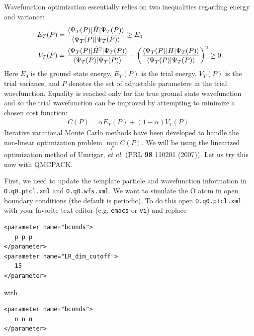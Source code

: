 {Wavefunction optimization essentially relies on two inequalities regarding energy and variance:
\begin{align}
  E_T(P) &= \frac{\expvalh{\Psi_T(P)}{H}{\Psi_T(P)}}{\overlap{\Psi_T(P)}{\Psi_T(P)}} \ge E_0 \\
  V_T(P) &= \frac{\expval{\Psi_T(P)}{\hat{H}^2}{\Psi_T(P)}}{\overlap{\Psi_T(P)}{\Psi_T(P)}} - \left(\frac{\expval{\Psi_T(P)}{H}{\Psi_T(P)}}{\overlap{\Psi_T(P)}{\Psi_T(P)}}\right)^2 \ge 0   
\end{align}
Here $E_0$ is the ground state energy, $E_T(P)$ is the trial energy, $V_T(P)$ is the trial variance, and $P$ denotes the set of adjustable parameters in the trial wavefunction.  Equality is reached only for the true ground state wavefunction and so the trial wavefunction can be improved by attempting to minimize a chosen cost function: 
\begin{align}
  C(P) = \alpha E_T(P) + (1-\alpha) V_T(P).
\end{align}  
Iterative varational Monte Carlo methods have been developed to handle the non-linear optimization problem $\min\limits_P C(P)$.  We will be using the linearized optimization method of Umrigar, \emph{et al.} (PRL \textbf{98} 110201 (2007)).  Let us try this now with QMCPACK.
}

First, we need to update the template particle and wavefunction information in \texttt{O.q0.ptcl.xml} and \texttt{O.q0.wfs.xml}.  We want to simulate the O atom in open boundary conditions (the default is periodic).  To do this open \texttt{O.q0.ptcl.xml} with your favorite text editor (e.g. \texttt{emacs} or \texttt{vi}) and replace
\begin{lstlisting}
<parameter name="bconds">
   p p p
</parameter>
<parameter name="LR_dim_cutoff">
   15
</parameter>
\end{lstlisting}
with
\begin{lstlisting}
<parameter name="bconds">
   n n n 
</parameter>
\end{lstlisting}

